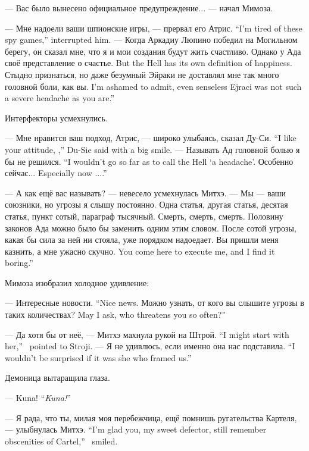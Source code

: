 --- Вас было вынесено официальное предупреждение... --- начал Мимоза.

{--- Мне надоели ваши шпионские игры, --- прервал его Атрис.}
{``I'm tired of these spy games,'' \Aatris{} interrupted him.}
--- Когда Аркадиу Люпино победил на Могильном берегу, он сказал мне, что я и мои создания будут жить счастливо.
{Однако у Ада своё представление о счастье.}
{But the Hell has its own definition of happiness.}
{Стыдно признаться, но даже безумный Эйраки не доставлял мне так много головной боли, как вы.}
{I'm ashamed to admit, even senseless Ejraci was not such a severe headache as you are.''}

Интерфекторы усмехнулись.

{--- Мне нравится ваш подход, Атрис, --- широко улыбаясь, сказал Ду-Си.}
{``I like your attitude, \Aatris{},'' Du-Sie said with a big smile.}
{--- Называть Ад головной болью я бы не решился.}
{``I wouldn't go so far as to call the Hell `a headache'.}
{Особенно сейчас...}
{Especially now ....''}

--- А как ещё вас называть? --- невесело усмехнулась Митхэ.
--- Мы --- ваши союзники, но угрозы я слышу постоянно.
Одна статья, другая статья, десятая статья, пункт сотый, параграф тысячный.
Смерть, смерть, смерть.
Половину законов Ада можно было бы заменить одним этим словом.
После сотой угрозы, какая бы сила за ней ни стояла, уже порядком надоедает.
{Вы пришли меня казнить, а мне ужасно скучно.}
{You come here to execute me, and I find it boring.''}

Мимоза изобразил холодное удивление:

{--- Интересные новости.}
{``Nice news.}
{Можно узнать, от кого вы слышите угрозы в таких количествах?}
{May I ask, who threatens you so often?''}

{--- Да хотя бы от неё, --- Митхэ махнула рукой на Штрой.}
{``I might start with her,'' \Mitchoe\ pointed to Stroji.}
{--- Я не удивлюсь, если именно она нас подставила.}
{``I wouldn't be surprised if it was she who framed us.''}

Демоница вытаращила глаза.

{--- Kuna!}
{``\emph{Kuna!}''}

{--- Я рада, что ты, милая моя перебежчица, ещё помнишь ругательства Картеля, --- улыбнулась Митхэ.}
{``I'm glad you, my sweet defector, still remember obscenities of Cartel,'' \Mitchoe\ smiled.}

